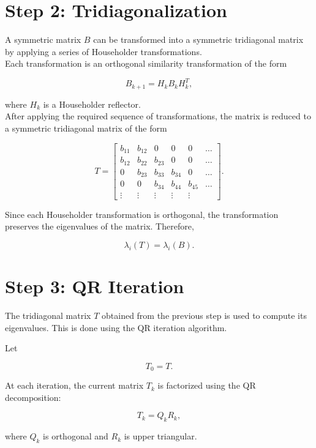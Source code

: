 \documentclass{article}
\begin{document}
\section{Step 2: Tridiagonalization}

A symmetric matrix $B$ can be transformed into a symmetric
tridiagonal matrix by applying a series of Householder
transformations.\\

Each transformation is an orthogonal similarity transformation
of the form

\[
    B_{k+1} = H_k B_k H_k^T,
\]

where $H_k$ is a Householder reflector.\\

After applying the required sequence of transformations, the
matrix is reduced to a symmetric tridiagonal matrix of the form

\[
    T =
    \begin{bmatrix}
        b_{11} & b_{12} & 0      & 0      & 0      & \dots \\
        b_{12} & b_{22} & b_{23} & 0      & 0      & \dots \\
        0      & b_{23} & b_{33} & b_{34} & 0      & \dots \\
        0      & 0      & b_{34} & b_{44} & b_{45} & \dots \\
        \vdots & \vdots & \vdots & \vdots & \vdots &
    \end{bmatrix}.
\]

Since each Householder transformation is orthogonal, the
transformation preserves the eigenvalues of the matrix. Therefore,

\[
    \lambda_i(T) = \lambda_i(B).
\]

\section{Step 3: QR Iteration}

The tridiagonal matrix $T$ obtained from the previous step is
used to compute its eigenvalues. This is done using the QR
iteration algorithm.

Let

\[
    T_0 = T.
\]

At each iteration, the current matrix $T_k$ is factorized using
the QR decomposition:

\[
    T_k = Q_k R_k,
\]

where $Q_k$ is orthogonal and $R_k$ is upper triangular.\\
\end{document}
